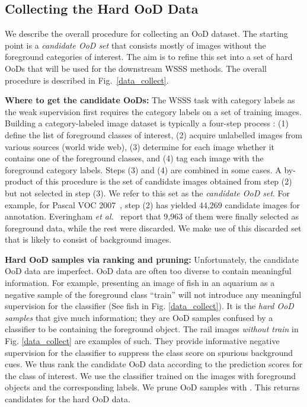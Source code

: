 \documentclass[10pt,twocolumn,letterpaper]{article}
\begin{document}
\subsection{Collecting the Hard OoD Data}\label{method_data}


We describe the overall procedure for collecting an OoD dataset. The starting point is a \textit{candidate OoD set} that consists mostly of images without the foreground categories of interest. 
The aim is to refine this set into a set of hard OoDs that will be used for the downstream WSSS methods. 
The overall procedure is described in Fig.~\ref{data_collect}.

\textbf{Where to get the candidate OoDs:}
The WSSS task with category labels as the weak supervision first requires the category labels on a set of training images. 
Building a category-labeled image dataset is typically a four-step process \cite{everingham2010pascal, kuznetsova2020open, lin2014microsoft, gupta2019lvis}: (1) define the list  of foreground classes of interest, (2) acquire unlabelled images from various sources (\eg world wide web), (3) determine for each image whether it contains one of the foreground classes, and (4) tag each image with the foreground category labels.
Steps (3) and (4) are combined in some cases.
A by-product of this procedure is the set of candidate images obtained from step (2) but not selected in step (3). We refer to this set as the \textit{candidate OoD set}. 
For example, for Pascal VOC 2007~\cite{everingham2010pascal}, step (2) has yielded 44,269 candidate images for annotation.
Everingham \textit{et al.}~\cite{everingham2010pascal} report that 9,963 of them were finally selected as foreground data, while the rest were discarded.
We make use of this discarded set that is likely to consist of background images.


\textbf{Hard OoD samples via ranking and pruning:}
Unfortunately, the candidate OoD data are imperfect. OoD data are often too diverse to contain meaningful information. For example, presenting an image of fish in an aquarium as a negative sample of the foreground class ``train'' will not introduce any meaningful supervision for the classifier (See fish in Fig. \ref{data_collect}). It is the \textit{hard OoD samples} that give much information; they are OoD samples confused by a classifier to be containing the foreground object. The rail images \textit{without train} in Fig. \ref{data_collect} are examples of such. They provide informative negative supervision for the classifier to suppress the class score on spurious background cues. 
We thus rank the candidate OoD data according to the prediction scores  for the class  of interest. 
We use the classifier trained on the images with foreground objects and the corresponding labels.
We prune OoD samples with . This returns candidates for the hard OoD data.
\end{document}
